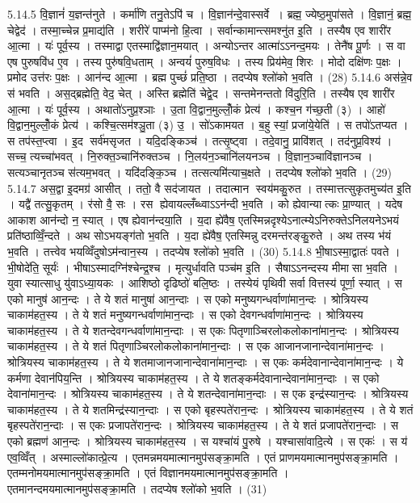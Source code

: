 5.14.5
वि॒ज्ञानं॑ य॒ज्ञन्त॑नुते । कर्मा॑णि तनु॒तेऽपि॑ च । वि॒ज्ञान॑न्दे॒वास्सर्वे । ब्रह्म॒ ज्येष्ठ॒मुपा॑सते । वि॒ज्ञानं॒ ब्रह्म॒ चेद्वेद॑ । तस्मा॒च्चेन्न प्र॒माद्य॑ति । शरीरे॑ पाप्म॑नो हि॒त्वा । सर्वान्कामान्त्समश्नु॑त इ॒ति । तस्यैष एव शारी॑र आ॒त्मा । यः॑ पूर्व॒स्य । तस्माद्वा एतस्माद्वि॑ज्ञान॒मयात् । अन्योऽन्तर आत्मा॑ऽऽनन्द॒मयः । तेनै॑ष पू॒र्णः । स वा एष पुरुषवि॑ध ए॒व । तस्य पुरु॑षवि॒धताम् । अन्वयं॑ पुरुष॒विधः । तस्य प्रिय॑मेव॒ शिरः । मोदो दक्षि॑णः प॒क्षः । प्रमोद उत्त॑रः प॒क्षः । आन॑न्द आ॒त्मा । ब्रह्म पुच्छं॑ प्रति॒ष्ठा । तदप्येष श्लो॑को भ॒वति । (28)
5.14.6
अस॑न्ने॒व स॑ भवति । अस॒द्ब्रह्मेति॒ वेद॒ चेत् । अस्ति ब्रह्मेति॑ चेद्वे॒द । सन्तमेनन्ततो वि॑दुरि॒ति । तस्यैष एव शारी॑र आ॒त्मा । यः॑ पूर्व॒स्य । अथातो॑ऽनुप्र॒श्ञाः । उ॒ता वि॒द्वान॒मुल्लोँ॒कं प्रेत्य॑ । कश्च॒न ग॑च्छ॒ती (३) । आहो॑ वि॒द्वान॒मुल्लोँ॒कं प्रेत्य॑ । कश्चि॒त्सम॑श्ञु॒ता (३) उ॒ । सो॑ऽकामयत । ब॒हु स्यां॒ प्रजा॑ये॒येति॑ । स तपो॑ऽतप्यत । स तप॑स्त॒प्त्वा । इ॒द सर्व॑मसृजत । यदि॒दङ्किञ्च॑ । तत्सृ॒ष्ट्वा । तदे॒वानु॒ प्रावि॑शत् । तद॑नुप्र॒विश्य॑ । सच्च॒ त्यच्चा॑भवत् । नि॒रुक्त॒ञ्चानि॑रुक्तञ्च । नि॒लय॑न॒ञ्चानि॑लयनञ्च । वि॒ज्ञान॒ञ्चावि॑ज्ञानञ्च । सत्यञ्चानृतञ्च स॑त्यम॒भवत् । यदि॑दङ्कि॒ञ्च । तत्सत्यमि॑त्याच॒क्षते । तदप्येष श्लो॑को भ॒वति । (29)
5.14.7
अस॒द्वा इ॒दमग्र॑ आसीत् । ततो॒ वै सद॑जायत । तदात्मान स्वय॑मकु॒रुत । तस्मात्तत्सुकृतमुच्य॑त इ॒ति । यद्वै॑ तत्सु॒कृतम् । र॑सो वै॒ सः । रस ह्येवायल्लँब्ध्वाऽऽन॑न्दी भ॒वति । को ह्येवान्यात्कः प्रा॒ण्यात् । यदेष आकाश आन॑न्दो न॒ स्यात् । एष ह्येवान॑न्दया॒ति । य॒दा ह्ये॑वैष॒ एतस्मिन्नदृश्येऽनात्म्येऽनिरुक्तेऽनिलयनेऽभयं प्रति॑ष्ठाव्विँ॒न्दते । अथ सोऽभयङ्ग॑तो भ॒वति । य॒दा ह्ये॑वैष॒ एतस्मिन्नु दरमन्त॑रङ्कु॒रुते । अथ तस्य भ॑यं भ॒वति । तत्त्वेव भयव्विँदुषोऽम॑न्वान॒स्य । तदप्येष श्लो॑को भ॒वति । (30)
5.14.8
भी॒षाऽस्मा॒द्वातः॑ पवते । भी॒षोदे॑ति॒ सूर्यः॑ । भीषाऽस्मादग्नि॑श्चेन्द्र॒श्च । मृत्युर्धावति पञ्च॑म इ॒ति । सैषाऽऽनन्दस्य मीमासा भ॒वति । युवा स्यात्साधु यु॑वाऽध्या॒यकः । आशिष्ठो दृढिष्ठो॑ बलि॒ष्ठः । तस्येयं पृथिवी सर्वा वित्तस्य॑ पूर्णा॒ स्यात् । स एको मानुष॑ आन॒न्दः । ते ये शतं मानुषा॑ आन॒न्दाः । स एको मनुष्यगन्धर्वाणा॑मान॒न्दः । श्रोत्रियस्य चाकाम॑हत॒स्य । ते ये शतं मनुष्यगन्धर्वाणा॑मान॒न्दाः । स एको देवगन्धर्वाणा॑मान॒न्दः । श्रोत्रियस्य चाकाम॑हत॒स्य । ते ये शतन्देवगन्धर्वाणा॑मान॒न्दाः । स एकः पितृणाञ्चिरलोकलोकाना॑मान॒न्दः । श्रोत्रियस्य चाकाम॑हत॒स्य । ते ये शतं पितृणाञ्चिरलोकलोकाना॑मान॒न्दाः । स एक आजानजानान्देवाना॑मान॒न्दः । श्रोत्रियस्य चाकाम॑हत॒स्य । ते ये शतमाजानजानान्देवाना॑मान॒न्दाः । स एकः कर्मदेवानान्देवाना॑मान॒न्दः । ये कर्मणा देवान॑पिय॒न्ति । श्रोत्रियस्य चाकाम॑हत॒स्य । ते ये शतङ्कर्मदेवानान्देवाना॑मान॒न्दाः । स एको देवाना॑मान॒न्दः । श्रोत्रियस्य चाकाम॑हत॒स्य । ते ये शतन्देवाना॑मान॒न्दाः । स एक इन्द्र॑स्यान॒न्दः । श्रोत्रियस्य चाकाम॑हत॒स्य । ते ये शतमिन्द्र॑स्यान॒न्दाः । स एको बृहस्पते॑रान॒न्दः । श्रोत्रियस्य चाकाम॑हत॒स्य । ते ये शतं बृहस्पते॑रान॒न्दाः । स एकः प्रजापते॑रान॒न्दः । श्रोत्रियस्य चाकाम॑हत॒स्य । ते ये शतं प्रजापते॑रान॒न्दाः । स एको ब्रह्मण॑ आन॒न्दः । श्रोत्रियस्य चाकाम॑हत॒स्य । स यश्चा॑यं पु॒रुषे । यश्चासा॑वादि॒त्ये । स एकः॑ । स य॑ एव॒व्विँत् । अस्माल्लो॑कात्प्रे॒त्य । एतमन्नमयमात्मानमुप॑सङ्क्रा॒मति । एतं प्राणमयमात्मानमुप॑सङ्क्रा॒मति । एतम्मनोमयमात्मानमुप॑सङ्क्रा॒मति । एतं विज्ञानमयमात्मानमुप॑सङ्क्रा॒मति । एतमानन्दमयमात्मानमुप॑सङ्क्रा॒मति । तदप्येष श्लो॑को भ॒वति । (31)

